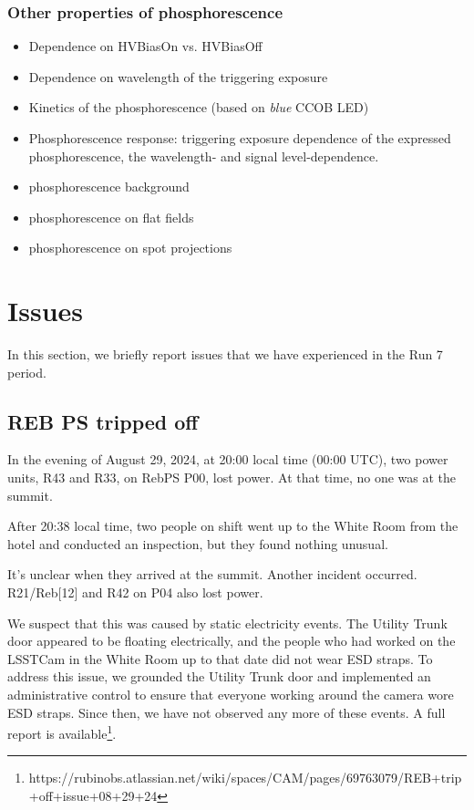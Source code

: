 \subsubsection{Other properties of phosphorescence}
\begin{itemize}
\tightlist
\item
  Dependence on HVBiasOn vs. HVBiasOff
\item
  Dependence on wavelength of the triggering exposure
\item
  Kinetics of the phosphorescence (based on {\it blue} CCOB LED)
  \item 
  Phosphorescence response: triggering exposure dependence of the expressed phosphorescence, the wavelength- and signal level-dependence. 
\end{itemize}


\begin{itemize}
\tightlist
\item
  phosphorescence background
\item
  phosphorescence on flat fields
\item
  phosphorescence on spot projections
\end{itemize}


\section{Issues}\label{sec:issues}
In this section, we briefly report issues that we have experienced in the Run 7 period.

\subsection{REB PS tripped off}
In the evening of August 29, 2024, at 20:00 local time (00:00 UTC), two power units, R43 and R33, on RebPS P00, lost power. At that time, no one was at the summit.

After 20:38 local time, two people on shift went up to the White Room from the hotel and conducted an inspection, but they found nothing unusual.

It's unclear when they arrived at the summit. Another incident occurred. R21/Reb[12] and R42 on P04 also lost power.

We suspect that this was caused by static electricity events. The Utility Trunk door appeared to be floating electrically, and the people who had worked on the LSSTCam in the White Room up to that date did not wear ESD straps. To address this issue, we grounded the Utility Trunk door and implemented an administrative control to ensure that everyone working around the camera wore ESD straps. Since then, we have not observed any more of these events.
A full report is available\footnote{https://rubinobs.atlassian.net/wiki/spaces/CAM/pages/69763079/REB+trip+off+issue+08+29+24}.

